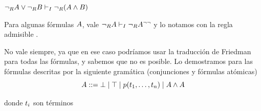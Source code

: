 \begin{lemma}
    \label{fri:lemma:fnot-dist-over-and-right}
    \(
    \neg_R A \vee \neg_R B \vdash_I \neg_R(A \wedge B)
    \)
\end{lemma}

\begin{lemma}
    \label{fri:lemma:notr-trans-intro}
    Para algunas fórmulas $A$, vale $\neg_R A \vdash_I \neg_R A^{\neg\neg}$ y lo notamos con la regla admisible .
    
    No vale siempre, ya que en ese caso podríamos usar la traducción de Friedman para todas las fórmulas, y sabemos que no es posible. Lo demostramos para las fórmulas descritas por la siguiente gramática (conjunciones y fórmulas atómicas)
    \[
        A ::=
            \bot \mid \top \mid p(t_1, \dots, t_n)
            \mid A \wedge A
    \]

    donde $t_i$ son términos
\end{lemma}
